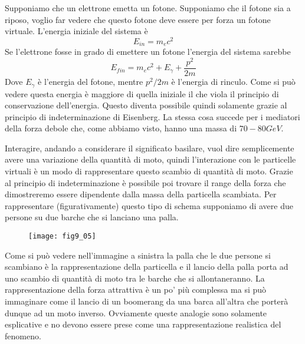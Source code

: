 Supponiamo che un elettrone emetta un fotone.
Supponiamo che il fotone sia a riposo, voglio far vedere che questo fotone deve essere per forza un fotone virtuale.
L'energia iniziale  del sistema è 
\begin{equation}
E_{in}=m_ec^2
\end{equation}
Se l'elettrone fosse in grado di emettere un fotone l'energia del sistema sarebbe
\begin{equation}
E_{fin}=m_ec^2+E_\gamma+\frac{p^2}{2m}
\end{equation}
Dove $E_\gamma$ è l'energia del fotone, mentre $p^2/2m$ è l'energia di rinculo.
Come si può vedere questa energia è maggiore di quella iniziale il che viola il principio di conservazione dell'energia.
Questo diventa possibile quindi solamente grazie al principio di indeterminazione di Eisenberg.
La stessa cosa succede per i mediatori della forza debole che, come abbiamo visto, hanno una massa di $70-80 GeV$.

Interagire, andando a considerare il significato basilare, vuol dire semplicemente avere una variazione della quantità di moto, quindi l'interazione con le particelle virtuali è un modo di rappresentare questo scambio di quantità di moto.
Grazie al principio di indeterminazione è possibile poi trovare il range della forza che dimostreremo essere dipendente dalla massa della particella scambiata.
Per rappresentare (figurativamente) questo tipo di schema supponiamo di avere due persone su due barche che si lanciano una palla.
\begin{figure}[h]
\centering
\texttt{[image: fig9\_05]}
\end{figure}

Come si può vedere nell'immagine a sinistra la palla che le due persone si scambiano è la rappresentazione della particella e il lancio della palla porta ad uno scambio di quantità di moto tra le barche che si allontaneranno.
La rappresentazione della forza attrattiva è un po' più complessa ma si può immaginare come il lancio di un boomerang da una barca all'altra che porterà dunque ad un moto inverso.
Ovviamente queste analogie sono solamente esplicative e no devono essere prese come una rappresentazione realistica del fenomeno.

